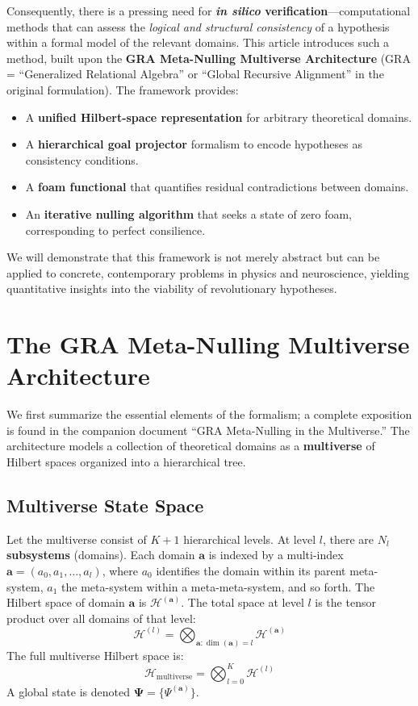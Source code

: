 \documentclass[11pt,a4paper]{article}
\begin{document}
Consequently, there is a pressing need for \textbf{\emph{in silico} verification}—computational methods that can assess the \emph{logical and structural consistency} of a hypothesis within a formal model of the relevant domains. This article introduces such a method, built upon the \textbf{GRA Meta-Nulling Multiverse Architecture} (GRA = ``Generalized Relational Algebra'' or ``Global Recursive Alignment'' in the original formulation). The framework provides:
\begin{itemize}
    \item A \textbf{unified Hilbert-space representation} for arbitrary theoretical domains.
    \item A \textbf{hierarchical goal projector} formalism to encode hypotheses as consistency conditions.
    \item A \textbf{foam functional} that quantifies residual contradictions between domains.
    \item An \textbf{iterative nulling algorithm} that seeks a state of zero foam, corresponding to perfect consilience.
\end{itemize}

We will demonstrate that this framework is not merely abstract but can be applied to concrete, contemporary problems in physics and neuroscience, yielding quantitative insights into the viability of revolutionary hypotheses.

\section{The GRA Meta-Nulling Multiverse Architecture}

We first summarize the essential elements of the formalism; a complete exposition is found in the companion document ``GRA Meta-Nulling in the Multiverse.'' The architecture models a collection of theoretical domains as a \textbf{multiverse} of Hilbert spaces organized into a hierarchical tree.

\subsection{Multiverse State Space}

Let the multiverse consist of \(K+1\) hierarchical levels. At level \(l\), there are \(N_l\) \textbf{subsystems} (domains). Each domain \(\mathbf{a}\) is indexed by a multi-index \(\mathbf{a} = (a_0, a_1, \dots, a_l)\), where \(a_0\) identifies the domain within its parent meta-system, \(a_1\) the meta-system within a meta-meta-system, and so forth. The Hilbert space of domain \(\mathbf{a}\) is \(\mathcal{H}^{(\mathbf{a})}\). The total space at level \(l\) is the tensor product over all domains of that level:
\begin{equation}
\mathcal{H}^{(l)} = \bigotimes_{\mathbf{a}: \dim(\mathbf{a}) = l} \mathcal{H}^{(\mathbf{a})}
\end{equation}
The full multiverse Hilbert space is:
\begin{equation}
\mathcal{H}_{\text{multiverse}} = \bigotimes_{l=0}^{K} \mathcal{H}^{(l)}
\end{equation}
A global state is denoted \(\mathbf{\Psi} = \{\Psi^{(\mathbf{a})}\}\).
\end{document}
